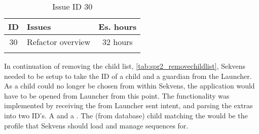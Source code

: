 \begin{longtable} { | c | p{12cm} | c | } 
\hline
	ID 	&	Issues	&		 Es. hours \\\hline
	30 	&	Refactor overview	&	32 hours \\\hline
\caption{Issue ID 30}
\label{tab:spr2_refactoroverview}
\end{longtable}

In continuation of removing the child list, \ref{tab:spr2_removechildlist}, Sekvens needed to be setup to take the ID of a child and a guardian from the Launcher. As a child could no longer be chosen from within Sekvens, the application would have to be opened from Launcher from this point. The functionality was implemented by receiving the from Launcher sent intent, and parsing the extras into two ID's. A  and a . The (from database) child matching the  would be the profile that Sekvens should load and manage sequences for.